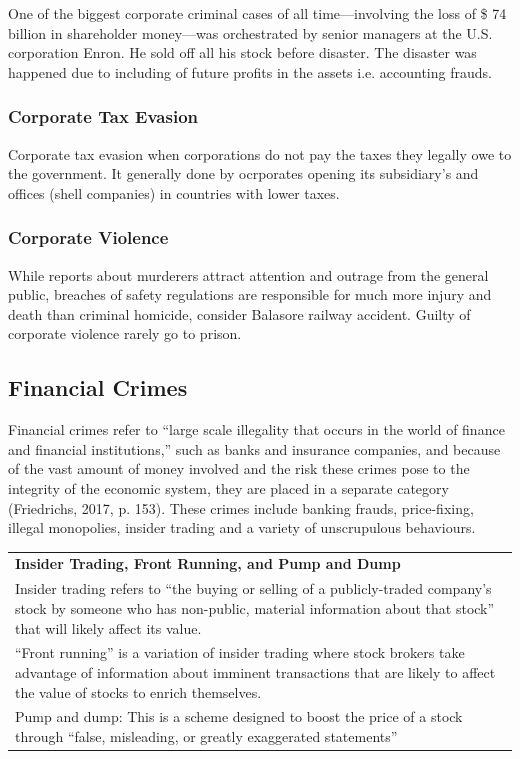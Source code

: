 \documentclass{article}
\begin{document}
One of the biggest corporate criminal cases of all time—involving the loss of \$ 74 billion in shareholder money—was orchestrated by senior managers at the U.S. corporation Enron. He sold off all his stock before disaster. The disaster was happened due to including of future profits in the assets i.e. accounting frauds.

\subsubsection*{Corporate Tax Evasion}

Corporate tax evasion when corporations do not pay the taxes they legally owe to the government. It generally done by ocrporates opening its subsidiary's and offices (shell companies) in countries with lower taxes.

\subsubsection*{Corporate Violence}

While reports about murderers attract attention and outrage from the general public, breaches of safety regulations are responsible for much more injury and death than criminal homicide, consider Balasore railway accident. Guilty of corporate violence rarely go to prison.

\subsection{Financial Crimes}

Financial crimes refer to “large scale illegality that occurs in the world of finance and financial institutions,” such as banks and insurance companies, and because of the vast amount of money involved and the risk these crimes pose to the integrity of the economic system, they are placed in a separate category (Friedrichs, 2017, p. 153). These crimes include banking frauds, price-fixing, illegal monopolies, insider trading and a variety of unscrupulous behaviours.

\begin{table}[H]
    \centering
    \begin{tabular}{|p{15.5cm}|}
        \hline        
        \textbf{Insider Trading, Front Running, and Pump and Dump} \\
        Insider trading refers to “the buying or selling of a publicly-traded company’s stock by someone who has non-public, material information about that stock” that will likely affect its value. \\
        “Front running” is a variation of insider trading where stock brokers take advantage of information about imminent transactions that are likely to affect the value of stocks to enrich themselves. \\
        Pump and dump: This is a scheme designed to boost the price of a stock through “false, misleading, or greatly exaggerated statements”\\
        \hline
    \end{tabular}
\end{table}
\end{document}
